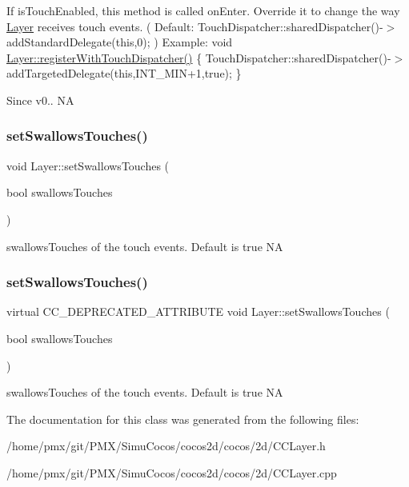 If is\+Touch\+Enabled, this method is called on\+Enter. Override it to change the way \hyperlink{classLayer}{Layer} receives touch events. ( Default\+: Touch\+Dispatcher\+::shared\+Dispatcher()-\/$>$add\+Standard\+Delegate(this,0); ) Example\+: void \hyperlink{classLayer_a988787d86ff8b8f1d0d75dcc6c2c181b}{Layer\+::register\+With\+Touch\+Dispatcher()} \{ Touch\+Dispatcher\+::shared\+Dispatcher()-\/$>$add\+Targeted\+Delegate(this,I\+N\+T\+\_\+\+M\+I\+N+1,true); \} \begin{DoxySince}{Since}
v0..  NA 
\end{DoxySince}
\mbox{\label{classLayer_a97217d10fcefbce95537ea3a4ea04baf}} 
\subsubsection{\texorpdfstring{set\+Swallows\+Touches()}{setSwallowsTouches()}\hspace{0.1cm}{\footnotesize\ttfamily [1/2]}}
{\footnotesize\ttfamily void Layer\+::set\+Swallows\+Touches (\begin{DoxyParamCaption}\item[{bool}]{swallows\+Touches }\end{DoxyParamCaption})\hspace{0.3cm}{\ttfamily [virtual]}}

swallows\+Touches of the touch events. Default is true  NA \mbox{\label{classLayer_a5f501802738f5f497da4dbf64a1a75e1}} 
\subsubsection{\texorpdfstring{set\+Swallows\+Touches()}{setSwallowsTouches()}\hspace{0.1cm}{\footnotesize\ttfamily [2/2]}}
{\footnotesize\ttfamily virtual C\+C\+\_\+\+D\+E\+P\+R\+E\+C\+A\+T\+E\+D\+\_\+\+A\+T\+T\+R\+I\+B\+U\+TE void Layer\+::set\+Swallows\+Touches (\begin{DoxyParamCaption}\item[{bool}]{swallows\+Touches }\end{DoxyParamCaption})\hspace{0.3cm}{\ttfamily [virtual]}}

swallows\+Touches of the touch events. Default is true  NA 

The documentation for this class was generated from the following files\+:\begin{DoxyCompactItemize}
\item 
/home/pmx/git/\+P\+M\+X/\+Simu\+Cocos/cocos2d/cocos/2d/C\+C\+Layer.\+h\item 
/home/pmx/git/\+P\+M\+X/\+Simu\+Cocos/cocos2d/cocos/2d/C\+C\+Layer.\+cpp\end{DoxyCompactItemize}
